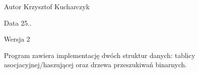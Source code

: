 \begin{DoxyAuthor}{\-Autor}
\-Krzysztof \-Kucharczyk 
\end{DoxyAuthor}
\begin{DoxyDate}{\-Data}
25.. 
\end{DoxyDate}
\begin{DoxyVersion}{\-Wersja}
2
\end{DoxyVersion}
\-Program zawiera implementację dwóch struktur danych\-: tablicy asocjacyjnej/haszującej oraz drzewa przeszukiwań binarnych. 